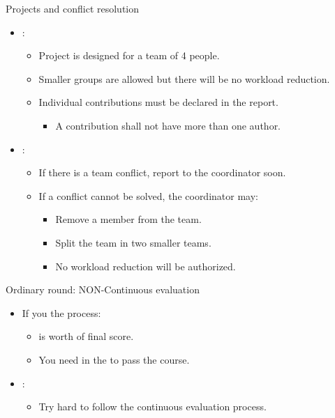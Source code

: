 \begin{frame}[t]{Projects and conflict resolution}
\begin{itemize}
  \item {}:
    \begin{itemize}
      \item Project is designed for a team of 4 people.
      \item Smaller groups are allowed but there will be no workload reduction.
      \item Individual contributions must be declared in the report.
        \begin{itemize}
          \item A contribution shall not have more than one author.
        \end{itemize}
    \end{itemize}

  \item {}:
    \begin{itemize}
      \item If there is a team conflict, report to the coordinator soon.
      \item If a conflict cannot be solved, the coordinator may:
        \begin{itemize}
          \item Remove a member from the team.
          \item Split the team in two smaller teams.
          \item No workload reduction will be authorized.
        \end{itemize}
    \end{itemize}
\end{itemize}
\end{frame}

\begin{frame}[t]{Ordinary round: NON-Continuous evaluation}
\begin{itemize}
  \item If you  the  process:
    \begin{itemize}
      \item {} is worth  of final score.
      \item You need  in the  to pass the course.
    \end{itemize}

  \item {}:
    \begin{itemize}
      \item Try hard to follow the continuous evaluation process.
    \end{itemize}
\end{itemize}
\end{frame}


